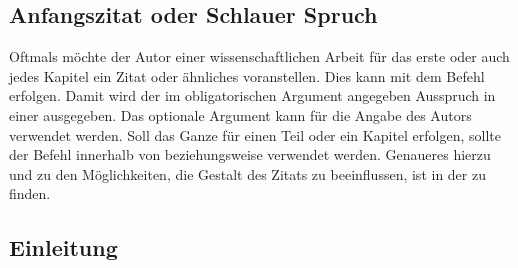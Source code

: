 \documentclass[%
  english,ngerman,%
  geometry=no,DIV=12,automark,%
]{tudscrartcl}
\begin{document}
\section{Anfangszitat oder Schlauer Spruch}
\bigskip\noindent
Oftmals möchte der Autor einer wissenschaftlichen Arbeit für das erste oder 
auch jedes Kapitel ein Zitat oder ähnliches voranstellen. Dies kann mit dem 
Befehl  erfolgen. Damit wird 
der im obligatorischen Argument angegeben Ausspruch in einer  
ausgegeben. Das optionale Argument kann für die Angabe des Autors verwendet 
werden. Soll das Ganze für einen Teil oder ein Kapitel erfolgen, sollte der 
Befehl  innerhalb von  beziehungsweise 
 verwendet werden. Genaueres hierzu und zu den 
Möglichkeiten, die Gestalt des Zitats zu beeinflussen, ist in der \scrguide zu 
finden.
\begin{Excerpt*}
\chapter{Einleitung}
\end{Excerpt*}
\end{document}
